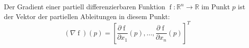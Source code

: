 Der Gradient einer partiell differenzierbaren Funktion $\operatorname{f} : \mathbb{R}^n \to \mathbb{R}$ im Punkt $p$ ist der Vektor der partiellen Ableitungen in diesem Punkt:
$$(\nabla \operatorname{f}) (p) = [\frac{\partial \operatorname{f}}{\partial x_1}(p), \dots, \frac{\partial{\operatorname{f}}}{\partial x_n}(p)]^T$$
